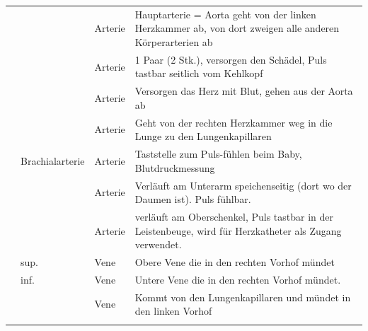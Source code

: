 \begin{gWideParEnv}
{\begin{tabulary}{\linewidth}{lllL}
\\\addlinespace
\noindent{}
&
\noindent{}
&
\noindent{}
&
\noindent{}
\\\midrule\addlinespace
{} 
&
 
&
Arterie
&
Hauptarterie = Aorta geht von der linken Herzkammer ab, von dort zweigen alle
anderen Körperarterien ab
\\\addlinespace
{} 
&
 
&
Arterie
&
1 Paar (2 Stk.), versorgen den Schädel, Puls tastbar seitlich vom
Kehlkopf
\\\addlinespace
{} 
&
 
&
Arterie
&
Versorgen das Herz mit Blut, gehen aus der Aorta ab
\\\addlinespace
{} 
&
 
&
Arterie
&
\noindent{} Geht von der rechten Herzkammer weg in
die Lunge zu den Lungenkapillaren
\\\addlinespace
{} 
&
Brachialarterie
&
Arterie
&
Taststelle zum Puls-fühlen beim Baby, Blutdruckmessung
\\\addlinespace
{} 
&
 
&
Arterie
&
Verläuft am Unterarm speichenseitig (dort wo der Daumen ist). Puls
fühlbar.
\\\addlinespace
{} 
&
 
&
Arterie
&
verläuft am Oberschenkel, Puls tastbar in der Leistenbeuge, wird für
Herzkatheter als Zugang verwendet. \\\addlinespace
{} 
&
 sup. 
&
Vene
&
Obere Vene die in den rechten Vorhof mündet
\\\addlinespace
{}
&
 inf. 
&
Vene
&
Untere Vene die in den rechten Vorhof mündet.
\\\addlinespace
{} 
&
 
&
Vene
&
 Kommt von den Lungenkapillaren und
mündet in den linken Vorhof
\\\addlinespace

\end{tabulary}}
\end{gWideParEnv}
